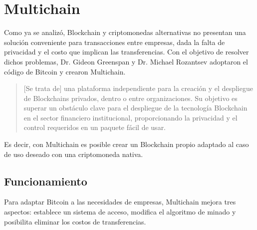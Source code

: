 \section{Multichain}

Como ya se analizó, Blockchain y criptomonedas alternativas no presentan una solución conveniente para transacciones entre empresas, dada la falta de privacidad y el costo que implican las transferencias. Con el objetivo de resolver dichos problemas, Dr. Gideon Greenspan y Dr. Michael Rozantsev adoptaron el código de Bitcoin y crearon Multichain.
\begin{quote}
[Se trata de] una plataforma independiente para la creación y el despliegue de Blockchains privados, dentro o entre organizaciones. Su objetivo es superar un obstáculo clave para el despliegue de la tecnología Blockchain en el sector financiero institucional, proporcionando la privacidad y el control requeridos en un paquete fácil de usar.\cite{multichain_whitepaper}
\end{quote}
Es decir, con Multichain es posible crear un Blockchain propio adaptado al caso de uso deseado con una criptomoneda nativa.

\subsection{Funcionamiento}
Para adaptar Bitcoin a las necesidades de empresas, Multichain mejora tres aspectos: establece un sistema de acceso, modifica el algoritmo de minado y posibilita eliminar los costos de transferencias.

